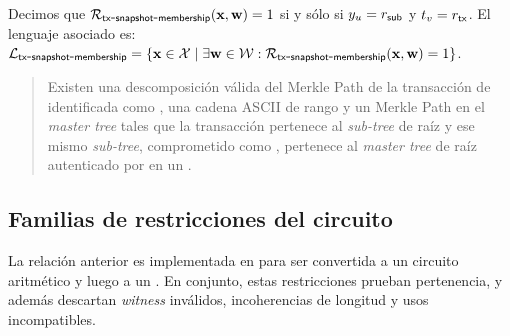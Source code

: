 Decimos que $\mathcal{R}_{\mathsf{tx\mbox{-}snapshot\mbox{-}membership}}(\mathbf{x}, \mathbf{w}) = 1$ si y sólo si $y_u = r_{\mathsf{sub}}$ y $t_v = r_{\mathsf{tx}}$. El lenguaje asociado es: $\mathcal{L}_{\mathsf{tx\mbox{-}snapshot\mbox{-}membership}} = \left\{\mathbf{x} \in \mathcal{X} \;\middle|\; \exists \mathbf{w} \in \mathcal{W}: \mathcal{R}_{\mathsf{tx\mbox{-}snapshot\mbox{-}membership}}(\mathbf{x}, \mathbf{w}) = 1\right\}$.
\begin{quote}
  Existen una descomposición válida del Merkle Path de la transacción de \ChainA identificada como \TxId, una cadena ASCII de rango y un Merkle Path en el \textit{master tree} tales que la transacción pertenece al \textit{sub-tree} de raíz \SnapshotSubRoot y ese mismo \textit{sub-tree}, comprometido como \MasterLeaf, pertenece al \textit{master tree} de raíz \TxSetRoot autenticado por \Mithril en un \TransactionSnapshotCertificate.
\end{quote}

\subsection{Familias de restricciones del circuito}
\label{subsec:tx-snapshot-membership-familias-de-restricciones-del-circuito}

La relación anterior es implementada en \Circom para ser convertida a un circuito aritmético y luego a un \QAP. En conjunto, estas restricciones prueban pertenencia, y además descartan \textit{witness} inválidos, incoherencias de longitud y usos incompatibles.

